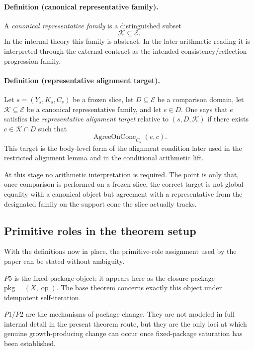 \documentclass[11pt]{article}
\begin{document}
\paragraph{Definition (canonical representative family).}
A \emph{canonical representative family} is a distinguished subset
\[
\mathcal{K}\subseteq \mathcal{E}.
\]
In the internal theory this family is abstract. In the later arithmetic reading it is interpreted through the external contract as the intended consistency/reflection progression family.

\paragraph{Definition (representative alignment target).}
Let $s=(Y_s,K_s,C_s)$ be a frozen slice, let $D\subseteq \mathcal{E}$ be a comparison domain, let $\mathcal{K}\subseteq \mathcal{E}$ be a canonical representative family, and let $e\in D$. One says that $e$ satisfies the \emph{representative alignment target} relative to $(s,D,\mathcal{K})$ if there exists $c\in \mathcal{K}\cap D$ such that
\[
\operatorname{AgreeOnCone}_{C_s}(e,c).
\]
This target is the body-level form of the alignment condition later used in the restricted alignment lemma and in the conditional arithmetic lift.

At this stage no arithmetic interpretation is required. The point is only that, once comparison is performed on a frozen slice, the correct target is not global equality with a canonical object but agreement with a representative from the designated family on the support cone the slice actually tracks.

\subsection*{Primitive roles in the theorem setup}

With the definitions now in place, the primitive-role assignment used by the paper can be stated without ambiguity.

\(P5\) is the fixed-package object: it appears here as the closure package $\mathrm{pkg}=(X,\operatorname{op})$. The base theorem concerns exactly this object under idempotent self-iteration.

\(P1/P2\) are the mechanisms of package change. They are not modeled in full internal detail in the present theorem route, but they are the only loci at which genuine growth-producing change can occur once fixed-package saturation has been established.
\end{document}
